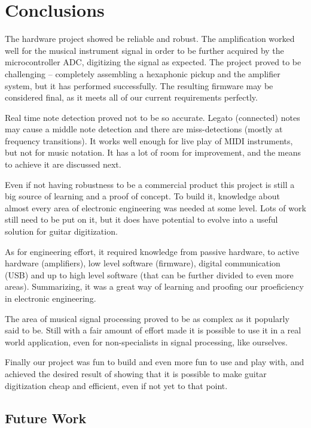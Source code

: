 \chapter[Conclusion]{Conclusions}

The hardware project showed be reliable and robust. The amplification worked
well for the musical instrument signal in order to be further acquired by the
microcontroller ADC, digitizing the signal as expected.
The project proved to be challenging -- completely assembling a
hexaphonic pickup and the amplifier system, but it has performed successfully.
The resulting firmware may be considered final, as it meets all of our
current requirements perfectly.

Real time note detection proved not to be so accurate. Legato (connected) notes
may cause a middle note detection and there are miss-detections (mostly at frequency
transitions). It works well enough for live play of MIDI instruments, but not
for music notation. It has a lot of room for improvement, and the means to achieve
it are discussed next.

Even if not having robustness to be a commercial product this project is still a big source
of learning and a proof of concept. To build it, knowledge about almost every area
of electronic engineering was needed at some level. Lots of work still need to be put on it,
but it does have potential to evolve into a useful solution for guitar digitization.

As for engineering effort, it required knowledge from passive hardware, to active hardware
(amplifiers), low level software (firmware), digital communication (USB) and up to high
level software (that can be further divided to even more areas). Summarizing, it was
a great way of learning and proofing our proeficiency in electronic engineering.

The area of musical signal processing proved to be as complex as it popularly said to be.
Still with a fair amount of effort made it is possible to use it in a real world application,
even for non-specialists in signal processing, like ourselves.

Finally our project was fun to build and even more fun to use and play with, and achieved
the desired result of showing that it is possible to make guitar digitization cheap and
efficient, even if not yet to that point.

\section{Future Work}

